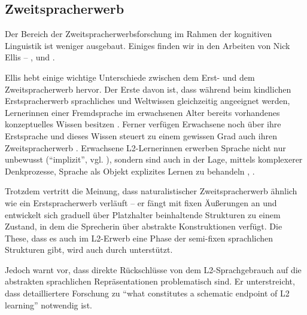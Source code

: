 \subsection{Zweitspracherwerb}
Der Bereich der Zweitspracherwerbsforschung im Rahmen der kognitiven Linguistik ist weniger ausgebaut.
Einiges finden wir in den Arbeiten von Nick Ellis -- \cite{Ellis04}, \cite{Ellis06} und \cite{Ellis08}.

Ellis hebt einige wichtige Unterschiede zwischen dem Erst- und dem Zweitspracherwerb hervor.
Der Erste davon ist, dass während beim kindlichen Erstspracherwerb sprachliches und Weltwissen gleichzeitig angeeignet werden, Lernerinnen einer Fremdsprache im erwachsenen Alter bereits vorhandenes konzeptuelles Wissen besitzen \cite{Ellis08}.
Ferner verfügen Erwachsene noch über ihre Erstsprache und dieses Wissen steuert zu einem gewissen Grad auch ihren Zweitspracherwerb \cite{Ellis08}.
Erwachsene L2-Lernerinnen erwerben Sprache nicht nur unbewusst (``implizit'', vgl. \cite{Ellis04}), sondern sind auch in der Lage, mittels komplexerer Denkprozesse, Sprache als Objekt explizites Lernen zu behandeln \cite{Ellis08}, \cite{Ellis04}.

Trotzdem vertritt \cite{Ellis08} die Meinung, dass naturalistischer Zweitspracherwerb ähnlich wie ein Erstspracherwerb verläuft --
er fängt mit fixen Äußerungen an und entwickelt sich graduell über Platzhalter beinhaltende Strukturen zu einem Zustand, in dem die Sprecherin über abstrakte Konstruktionen verfügt.
Die These, dass es auch im L2-Erwerb eine Phase der semi-fixen sprachlichen Strukturen gibt, wird auch durch \cite{Eskildsen08} unterstützt.

Jedoch warnt \cite{Eskildsen08} vor, dass direkte Rückschlüsse von dem L2-Sprachgebrauch auf die abstrakten sprachlichen Repräsentationen problematisch sind.
Er unterstreicht, dass detailliertere Forschung zu ``what constitutes a schematic endpoint of L2 learning'' notwendig ist.



